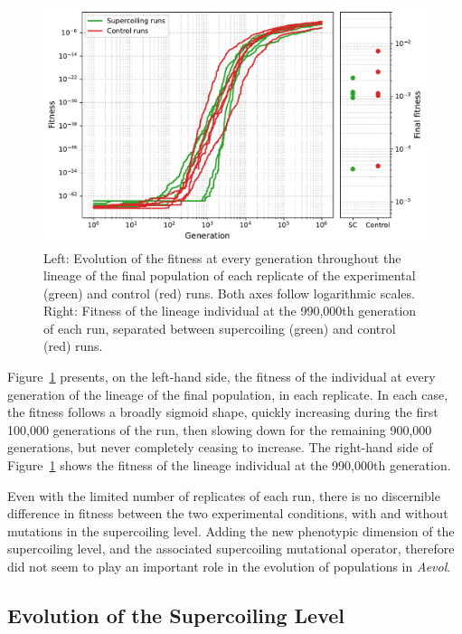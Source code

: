 \begin{figure}[H]
  \includegraphics[width=\textwidth]{aevol/images/fitness_all.pdf}
  \caption[Evolution of the fitness of the control and experimental runs in \emph{Aevol}]{Left: Evolution of the fitness at every generation throughout the lineage of the final population of each replicate of the experimental (green) and control (red) runs.
  Both axes follow logarithmic scales.
  Right: Fitness of the lineage individual at the 990,000th generation of each run, separated between supercoiling (green) and control (red) runs.}
  \label{fig:aevol:fitness}
\end{figure}

Figure~\ref{fig:aevol:fitness} presents, on the left-hand side, the fitness of the individual at every generation of the lineage of the final population, in each replicate.
In each case, the fitness follows a broadly sigmoid shape, quickly increasing during the first 100,000 generations of the run, then slowing down for the remaining 900,000 generations, but never completely ceasing to increase.
The right-hand side of Figure~\ref{fig:aevol:fitness} shows the fitness of the lineage individual at the 990,000th generation.

Even with the limited number of replicates of each run, there is no discernible difference in fitness between the two experimental conditions, with and without mutations in the supercoiling level.
Adding the new phenotypic dimension of the supercoiling level, and the associated supercoiling mutational operator, therefore did not seem to play an important role in the evolution of populations in \emph{Aevol}.

\subsection{Evolution of the Supercoiling Level}

